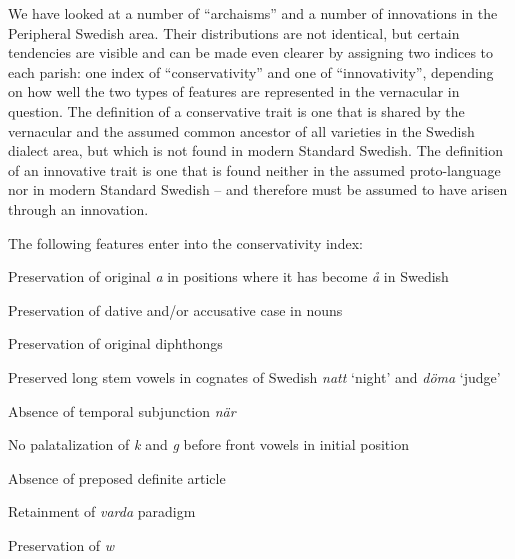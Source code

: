 \begin{styleBodyTextFirst}
We have looked at a number of “archaisms” and a number of innovations in the Peripheral Swedish area. Their distributions are not identical, but certain tendencies are visible and can be made even clearer by assigning two indices to each parish: one index of “conservativity” and one of “innovativity”, depending on how well the two types of features are represented in the vernacular in question. The definition of a conservative trait is one that is shared by the vernacular and the assumed common ancestor of all varieties in the Swedish dialect area, but which is not found in modern Standard Swedish. The definition of an innovative trait is one that is found neither in the assumed proto-language nor in modern Standard Swedish – and therefore must be assumed to have arisen through an innovation. 

\end{styleBodyTextFirst}

The following features enter into the conservativity index:

\begin{listWWNumxiiileveli}
\item 

Preservation of original \textit{a} in positions where it has become \textit{å} in Swedish

\item 

Preservation of dative and/or accusative case in nouns

\item 

Preservation of original diphthongs

\item 

Preserved long stem vowels in cognates of Swedish \textit{natt} ‘night’ and \textit{döma} ‘judge’

\item 

Absence of temporal subjunction \textit{när}

\item 

No palatalization of \textit{k} and \textit{g} before front vowels in initial position

\item 

Absence of preposed definite article

\item 

Retainment of \textit{varda} paradigm

\item 

Preservation of \textit{w}

\end{listWWNumxiiileveli}

